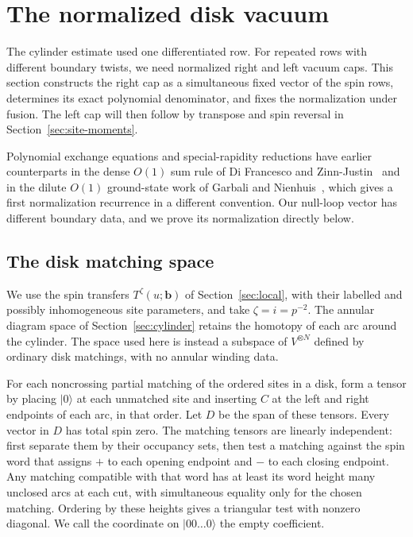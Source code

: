 \section{The normalized disk vacuum}\label{sec:vacuum}

The cylinder estimate used one differentiated row. For repeated rows with different boundary twists, we need normalized right and left vacuum caps. This section constructs the right cap as a simultaneous fixed vector of the spin rows, determines its exact polynomial denominator, and fixes the normalization under fusion. The left cap will then follow by transpose and spin reversal in Section~\ref{sec:site-moments}.

Polynomial exchange equations and special-rapidity reductions have earlier counterparts in the dense $O(1)$ sum rule of Di Francesco and Zinn-Justin~\cite{DiFrancescoZinnJustin2005} and in the dilute $O(1)$ ground-state work of Garbali and Nienhuis~\cite{GarbaliNienhuis2017Ground,GarbaliNienhuis2017Sum}, which gives a first normalization recurrence in a different convention. Our null-loop vector has different boundary data, and we prove its normalization directly below.

\subsection{The disk matching space}

We use the spin transfers \(T^\zeta(u;\mathbf b)\) of Section~\ref{sec:local}, with their labelled and possibly inhomogeneous site parameters, and take \(\zeta=i=p^{-2}\). The annular diagram space of Section~\ref{sec:cylinder} retains the homotopy of each arc around the cylinder. The space used here is instead a subspace of \(V^{\otimes N}\) defined by ordinary disk matchings, with no annular winding data.

For each noncrossing partial matching of the ordered sites in a disk, form a tensor by placing \(|0\rangle\) at each unmatched site and inserting \(C\) at the left and right endpoints of each arc, in that order. Let \(D\) be the span of these tensors. Every vector in \(D\) has total spin zero. The matching tensors are linearly independent: first separate them by their occupancy sets, then test a matching against the spin word that assigns \(+\) to each opening endpoint and \(-\) to each closing endpoint. Any matching compatible with that word has at least its word height many unclosed arcs at each cut, with simultaneous equality only for the chosen matching. Ordering by these heights gives a triangular test with nonzero diagonal. We call the coordinate on \(|00\ldots0\rangle\) the empty coefficient.

